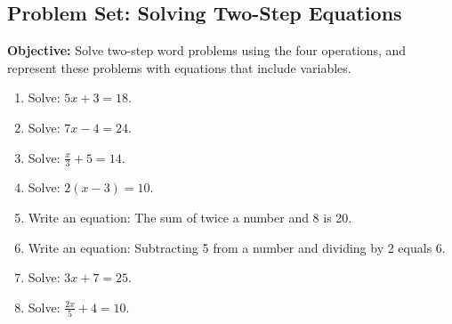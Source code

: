\documentclass[12pt]{article}
\title{}
\date{}
\begin{document}
\subsection*{Problem Set: Solving Two-Step Equations}
\onehalfspacing

\begin{tcolorbox}[colframe=black!40, colback=gray!5, 
coltitle=black, colbacktitle=black!20, fonttitle=\bfseries\Large, 
title=Learning Objective, halign title=center, left=5pt, right=5pt, top=5pt, bottom=15pt]
\textbf{Objective:} Solve two-step word problems using the four operations, and represent these problems with equations that include variables.
\end{tcolorbox}

\begin{tcolorbox}[colframe=black!60, colback=white, 
coltitle=black, colbacktitle=black!15, fonttitle=\bfseries\Large, 
title=Exercises, halign title=center, left=10pt, right=10pt, top=10pt, bottom=60pt]
\begin{enumerate}[itemsep=3em]
    \item Solve: \( 5x + 3 = 18 \).
    \item Solve: \( 7x - 4 = 24 \).
    \item Solve: \( \frac{x}{3} + 5 = 14 \).
    \item Solve: \( 2(x - 3) = 10 \).
    \item Write an equation: The sum of twice a number and 8 is 20.
    \item Write an equation: Subtracting 5 from a number and dividing by 2 equals 6.
    \item Solve: \( 3x + 7 = 25 \).
    \item Solve: \( \frac{2x}{5} + 4 = 10 \).
\end{enumerate}
\end{tcolorbox}

\vspace{1em}
\end{document}
